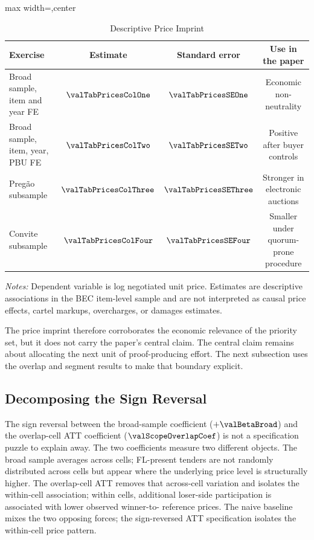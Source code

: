 \begin{table}[htbp]
\centering
\caption{Descriptive Price Imprint}
\label{tab:price_imprint_submission}
\footnotesize
\begin{adjustbox}{max width=\textwidth,center}
\begin{threeparttable}
\begin{tabular}{p{5.4cm}ccc}
\toprule
Exercise & Estimate & Standard error & Use in the paper \\
\midrule
Broad sample, item and year FE & $\valTabPricesColOne$ &
$\valTabPricesSEOne$ & Economic non-neutrality \\
Broad sample, item, year, PBU FE & $\valTabPricesColTwo$ &
$\valTabPricesSETwo$ & Positive after buyer controls \\
Pregão subsample & $\valTabPricesColThree$ &
$\valTabPricesSEThree$ & Stronger in electronic auctions \\
Convite subsample & $\valTabPricesColFour$ &
$\valTabPricesSEFour$ & Smaller under quorum-prone procedure \\
\bottomrule
\end{tabular}
\begin{tablenotes}
\footnotesize
\item \textit{Notes:} Dependent variable is log negotiated unit
price. Estimates are descriptive associations in the BEC
item-level sample and are not interpreted as causal price
effects, cartel markups, overcharges, or damages estimates.
\end{tablenotes}
\end{threeparttable}
\end{adjustbox}
\end{table}

The price imprint therefore corroborates the economic relevance
of the priority set, but it does not carry the paper's central
claim. The central claim remains about allocating the next unit
of proof-producing effort. The next subsection uses the overlap
and segment results to make that boundary explicit.

\subsection{Decomposing the Sign Reversal}
\label{sec:price_scope_submission}

The sign reversal between the broad-sample coefficient
($+\valBetaBroad$) and the overlap-cell ATT coefficient
($\valScopeOverlapCoef$) is not a specification puzzle to
explain away. The two coefficients measure two different
objects. The broad sample averages across cells; FL-present
tenders are not randomly distributed across cells but appear
where the underlying price level is structurally higher. The
overlap-cell ATT removes that across-cell variation and isolates
the within-cell association; within cells, additional loser-side
participation is associated with lower observed winner-to-
reference prices. The naive baseline mixes the two opposing
forces; the sign-reversed ATT specification isolates the
within-cell price pattern.

